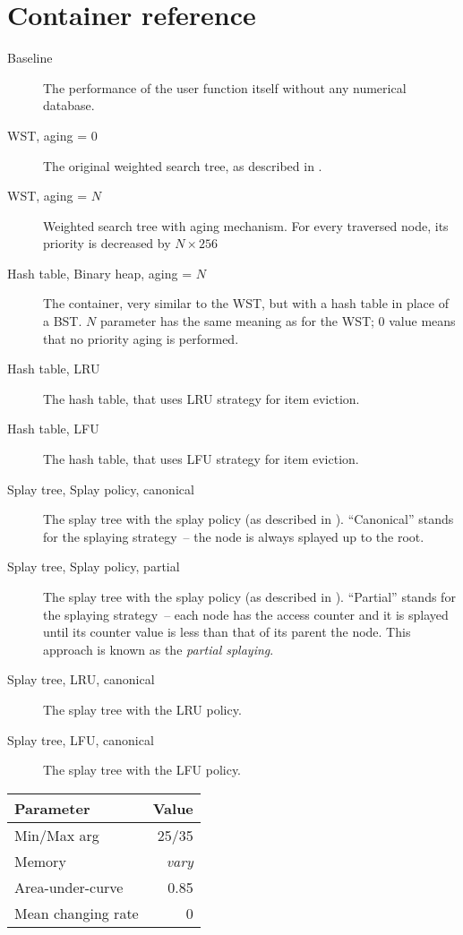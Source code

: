 \section{Container reference}
\begin{description}
\item[Baseline] The performance of the user function itself without any numerical database.
\item[WST, aging = 0] The original weighted search tree, as described in \cite{park94}.
\item[WST, aging = $N$] Weighted search tree with aging mechanism. For every traversed node, its priority is decreased by $N \times 256$
\item[Hash table, Binary heap, aging = $N$] The container, very similar to the WST, but with a hash table in place of a BST. $N$ parameter has the same meaning as for the WST; 0 value means that no priority aging is performed.
\item[Hash table, LRU] The hash table, that uses LRU strategy for item eviction.
\item[Hash table, LFU] The hash table, that uses LFU strategy for item eviction.

\item[Splay tree, Splay policy, canonical] The splay tree with the splay policy (as described in ). ``Canonical'' stands for the splaying strategy~-- the node is always splayed up to the root\cite{splay_tree}.
\item[Splay tree, Splay policy, partial] The splay tree with the splay policy (as described in ). ``Partial'' stands for the splaying strategy~-- each node has the access counter and it is splayed until its counter value is less than that of its parent the node. This approach is known as the \emph{partial splaying}\cite{partial_splaying}.
\item[Splay tree, LRU, canonical] The splay tree with the LRU policy.
\item[Splay tree, LFU, canonical] The splay tree with the LFU policy.
\end{description}
\pagebreak

\begin{tabular}[h]{l r} \toprule
Parameter & Value \\ \midrule
Min/Max arg & 25/35 \\
Memory & \emph{vary} \\
Area-under-curve & 0.85 \\
Mean changing rate & 0 \\ \bottomrule
\end{tabular}

